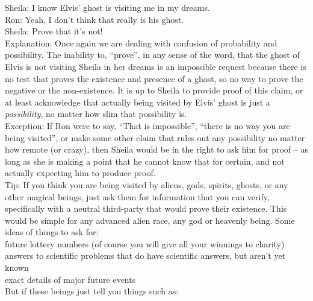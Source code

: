 \documentclass[a4paper,12pt,single,pdftex]{scrartcl}
\begin{document}
    
      Sheila: I know Elvis’ ghost is visiting me in my dreams.
    \\

    
      Ron: Yeah, I don’t think that really is his ghost.
    \\

    
      Sheila: Prove that it’s not!
    \\

    
      Explanation: Once again we are dealing with confusion of probability and possibility.  The inability to, “prove”, in any sense of the word, that the ghost of Elvis is not visiting Sheila in her dreams is an impossible request because there is no test that proves the existence and presence of a ghost, so no way to prove the negative or the non-existence.  It is up to Sheila to provide proof of this claim, or at least acknowledge that actually being visited by Elvis’ ghost is just a {\it possibility}, no matter how slim that possibility is.
    \\

    
      Exception: If Ron were to say, “That is impossible”, “there is no way you are being visited”, or make some other claim that rules out any possibility no matter how remote (or crazy), then Sheila would be in the right to ask him for proof -- as long as she is making a point that he cannot know that for certain, and not actually expecting him to produce proof.
    \\

    
      Tip: If you think you are being visited by aliens, gods, spirits, ghosts, or any other magical beings, just ask them for information that you can verify, specifically with a neutral third-party that would prove their existence.  This would be simple for any advanced alien race, any god or heavenly being.  Some ideas of things to ask for:
    \\

    
      future lottery numbers (of course you will give all your winnings to charity)
    \\

    
      answers to scientific problems that do have scientific answers, but aren’t yet known
    \\

    
      exact details of major future events
    \\

    
      But if these beings just tell you things such as:
    \\
\end{document}
